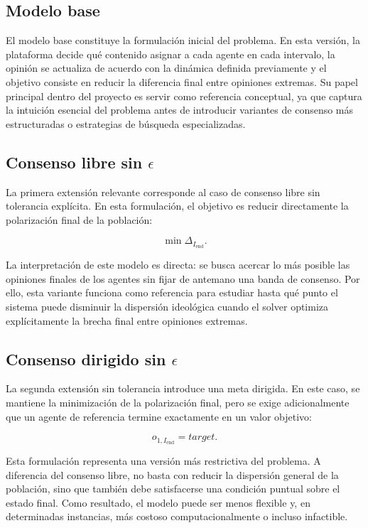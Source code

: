 \documentclass[10pt,letterpaper]{article}
\begin{document}
\subsection{Modelo base}

El modelo base constituye la formulaci\'on inicial del problema. En esta versi\'on, la plataforma decide qu\'e contenido asignar a cada agente en cada intervalo, la opini\'on se actualiza de acuerdo con la din\'amica definida previamente y el objetivo consiste en reducir la diferencia final entre opiniones extremas. Su papel principal dentro del proyecto es servir como referencia conceptual, ya que captura la intuici\'on esencial del problema antes de introducir variantes de consenso m\'as estructuradas o estrategias de b\'usqueda especializadas.

\subsection{Consenso libre sin \(\epsilon\)}

La primera extensi\'on relevante corresponde al caso de consenso libre sin tolerancia expl\'icita. En esta formulaci\'on, el objetivo es reducir directamente la polarizaci\'on final de la poblaci\'on:

\[
\min \Delta_{I_{\text{end}}}.
\]

La interpretaci\'on de este modelo es directa: se busca acercar lo m\'as posible las opiniones finales de los agentes sin fijar de antemano una banda de consenso. Por ello, esta variante funciona como referencia para estudiar hasta qu\'e punto el sistema puede disminuir la dispersi\'on ideol\'ogica cuando el solver optimiza expl\'icitamente la brecha final entre opiniones extremas.

\subsection{Consenso dirigido sin \(\epsilon\)}

La segunda extensi\'on sin tolerancia introduce una meta dirigida. En este caso, se mantiene la minimizaci\'on de la polarizaci\'on final, pero se exige adicionalmente que un agente de referencia termine exactamente en un valor objetivo:

\[
o_{1,I_{\text{end}}}=target.
\]

Esta formulaci\'on representa una versi\'on m\'as restrictiva del problema. A diferencia del consenso libre, no basta con reducir la dispersi\'on general de la poblaci\'on, sino que tambi\'en debe satisfacerse una condici\'on puntual sobre el estado final. Como resultado, el modelo puede ser menos flexible y, en determinadas instancias, m\'as costoso computacionalmente o incluso infactible.
\end{document}

